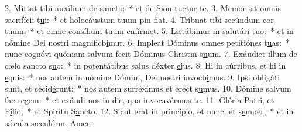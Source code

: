 2. Mittat tibi auxílium de s\uline{a}ncto:~* et de Sion tuet\uline{u}r te.
3. Memor sit omnis sacrifícii t\uline{u}i:~* et holocáustum tuum pin f\uline{i}at.
4. Tríbuat tibi secúndum cor t\uline{u}um:~* et omne consílium tuum cnf\uline{í}rmet.
5. Lætábimur in salutári t\uline{u}o:~* et in nómine Dei nostri magnificb\uline{i}mur.
6. Impleat Dóminus omnes petitiónes t\uline{u}as:~* nunc cognóvi quóniam salvum fecit Dóminus Christm s\uline{u}um.
7. Exáudiet illum de cælo sancto s\uline{u}o:~* in potentátibus salus déxter \uline{e}jus.
8. Hi in cúrribus, et hi in \uline{e}quis:~* nos autem in nómine Dómini, Dei nostri invocb\uline{i}mus.
9. Ipsi obligáti sunt, et cecid\uline{é}runt:~* nos autem surréximus et eréct s\uline{u}mus.
10. Dómine salvum fac r\uline{e}gem:~* et exáudi nos in die, qua invocavérm\uline{u}s te.
11. Glória Patri, et F\uline{í}lio,~* et Spirítu S\uline{a}ncto.
12. Sicut erat in princípio, et nunc, et s\uline{e}mper,~* et in sǽcula sæculórm. \uline{A}men.
